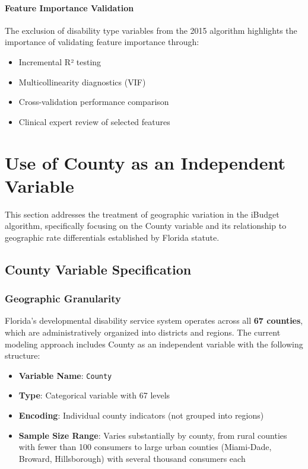 \paragraph{Feature Importance Validation}
The exclusion of disability type variables from the 2015 algorithm highlights the importance of validating feature importance through:
\begin{itemize}
    \item Incremental R² testing
    \item Multicollinearity diagnostics (VIF)
    \item Cross-validation performance comparison
    \item Clinical expert review of selected features
\end{itemize}

\section{Use of County as an Independent Variable}
\label{sec:county-variable}

This section addresses the treatment of geographic variation in the iBudget algorithm, specifically focusing on the County variable and its relationship to geographic rate differentials established by Florida statute.

\subsection{County Variable Specification}
\label{subsec:county-specification}

\subsubsection{Geographic Granularity}

Florida's developmental disability service system operates across all \textbf{67 counties}, which are administratively organized into districts and regions. The current modeling approach includes County as an independent variable with the following structure:

\begin{itemize}
    \item \textbf{Variable Name}: \texttt{County}
    \item \textbf{Type}: Categorical variable with 67 levels
    \item \textbf{Encoding}: Individual county indicators (not grouped into regions)
    \item \textbf{Sample Size Range}: Varies substantially by county, from rural counties with fewer than 100 consumers to large urban counties (Miami-Dade, Broward, Hillsborough) with several thousand consumers each
\end{itemize}

